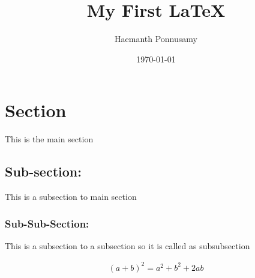 \documentclass{article}
\begin{document}
\author{Haemanth Ponnusamy}
\title{My First \LaTeX{}}
\date{\today{}}

\maketitle{}
\tableofcontents{}

\section{Section}
This is the main section
\subsection{Sub-section:}
This is a subsection to main section
\subsubsection{Sub-Sub-Section:}
This is a subsection to a subsection so it is called as subsubsection

\begin{align}

(a+b)^2 = a^2 + b^2 + 2ab

\end{align}
\end{document}
